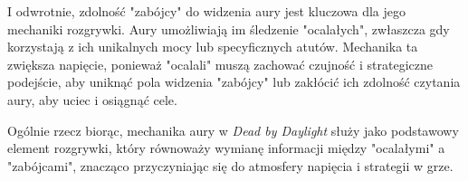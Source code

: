 I odwrotnie, zdolność "zabójcy" do widzenia aury jest kluczowa dla jego mechaniki rozgrywki.
Aury umożliwiają im śledzenie "ocalałych", zwłaszcza gdy korzystają z ich unikalnych mocy lub specyficznych atutów.
Mechanika ta zwiększa napięcie, ponieważ "ocalali" muszą zachować czujność i strategiczne podejście,
aby uniknąć pola widzenia "zabójcy" lub zakłócić ich zdolność czytania aury, aby uciec i osiągnąć cele.


Ogólnie rzecz biorąc, mechanika aury w \textit{Dead by Daylight} służy jako podstawowy element rozgrywki,
który równoważy wymianę informacji między "ocalałymi" a "zabójcami", znacząco przyczyniając się do atmosfery napięcia i strategii w grze.

